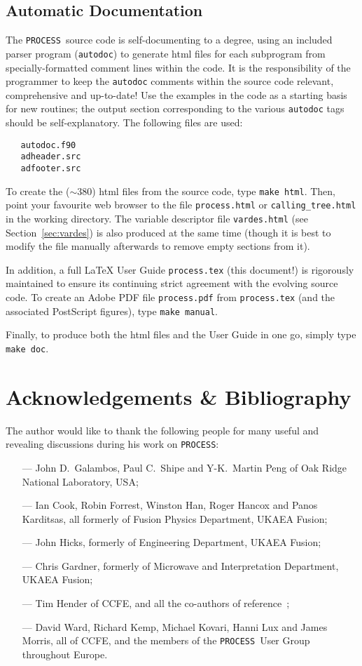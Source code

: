\documentclass[11pt,a4paper]{report}
\newcommand{\process}{\mbox{\texttt{PROCESS}}}
\newcommand{\setheader}[1]
 {\markright{\rlap{\lower0.8ex\hbox to\textwidth{\hrulefill}}{\bf#1}}}
\newcommand{\mychapter}[1]{\small\normalsize
 \setcounter{footnote}{0}
 \chapter{#1}
 \pagestyle{myheadings}
 \setheader{Chapter \thechapter\hspace{0.8em}#1}}
\begin{document}
\section{Automatic Documentation}
\label{sec:autodoc}

The \process\ source code is self-documenting to a degree, using an included
parser program (\texttt{autodoc}) to generate html files for each subprogram
from specially-formatted comment lines within the code. It is the
responsibility of the programmer to keep the \texttt{autodoc} comments within
the source code relevant, comprehensive and up-to-date! Use the examples in
the code as a starting basis for new routines; the output section
corresponding to the various \texttt{autodoc} tags should be
self-explanatory. The following files are used:
\begin{verbatim}
   autodoc.f90
   adheader.src
   adfooter.src
\end{verbatim}
To create the ($\sim 380$) html files from the source code, type
\verb+make html+.  Then, point your favourite web browser to the file
\texttt{process.html} or \texttt{calling\_tree.html} in the working
directory. The variable descriptor file \texttt{vardes.html} (see
Section~\ref{sec:vardes}) is also produced at the same time (though it is best
to modify the file manually afterwards to remove empty sections from it).

In addition, a full \LaTeX\/ User Guide \texttt{process.tex} (this document!) is
rigorously maintained to ensure its continuing strict agreement with the
evolving source code. To create an Adobe PDF file \texttt{process.pdf} from
\texttt{process.tex} (and the associated PostScript figures),
type \verb+make manual+.

Finally, to produce both the html files and the User Guide in one go, simply
type \verb+make doc+.


\mychapter{Acknowledgements \& Bibliography}
\label{chap:acks}

The author would like to thank the following people for many useful
and revealing discussions during his work on \process:

\begin{itemize}
\item[---]
John D.\ Galambos, Paul C.\ Shipe and Y-K.\ Martin Peng of Oak Ridge
National Laboratory, USA;
\item[---]
Ian Cook, Robin Forrest, Winston Han, Roger Hancox and Panos Karditsas, all formerly of
Fusion Physics Department, UKAEA Fusion;
\item[---]
John Hicks, formerly of Engineering Department, UKAEA Fusion;
\item[---]
Chris Gardner, formerly of Microwave and Interpretation Department, UKAEA
Fusion;
\item[---]
Tim Hender of CCFE, and all the co-authors of reference~\cite{172};
\item[---]
David Ward, Richard Kemp, Michael Kovari, Hanni Lux and James Morris, all of
CCFE, and the members of the \process\ User Group throughout Europe.
\end{itemize}
\end{document}
